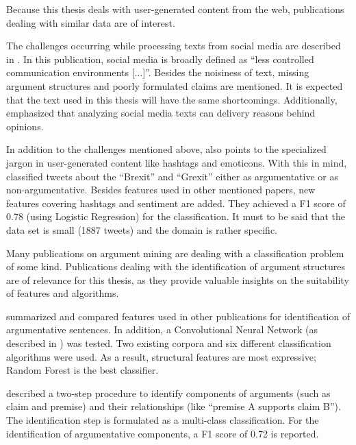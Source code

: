 Because this thesis deals with user-generated content from the web, publications dealing with similar data are of interest.

The challenges occurring while processing texts from social media are described in \cite{Snajder2017Social-Media-Ar}.  In this publication, social media is broadly defined as \enquote{less controlled communication environments [...]}. Besides the noisiness of text, missing argument structures and poorly formulated claims are mentioned. It is expected that the text used in this thesis will have the same shortcomings. Additionally, \cite{Snajder2017Social-Media-Ar} emphasized that analyzing social media texts can delivery reasons behind opinions. 

In addition to the challenges mentioned above, \cite{Dusmanu2017Argument-Mining} also points to the specialized jargon in user-generated content like hashtags and emoticons. With this in mind, \cite{Dusmanu2017Argument-Mining} classified tweets about the \enquote{Brexit} and \enquote{Grexit} either as argumentative or as non-argumentative. Besides features used in other mentioned papers, new features covering hashtags and sentiment are added. They achieved a F1 score of 0.78 (using Logistic Regression) for the classification. It must to be said that the data set is small (1887 tweets) and the domain is rather specific.\newline

Many publications on argument mining are dealing with a classification problem of some kind. Publications dealing with the identification of argument structures are of relevance for this thesis, as they provide valuable insights on the suitability of features and algorithms.

\cite{Aker2017What-works-and-} summarized and compared features used in other publications for identification of argumentative sentences. In addition, a Convolutional Neural Network (as described in \cite{Kim2014Convolutional-N}) was tested. Two existing corpora and six different classification algorithms were used. As a result, structural features are most expressive; Random Forest is the best classifier.

\cite{Stab2014Identifying-Arg} described a two-step procedure to identify components of arguments (such as claim and premise) and their relationships (like \enquote{premise A supports claim B}). The identification step is formulated as a multi-class classification. For the identification of argumentative components, a F1 score of 0.72 is reported.

